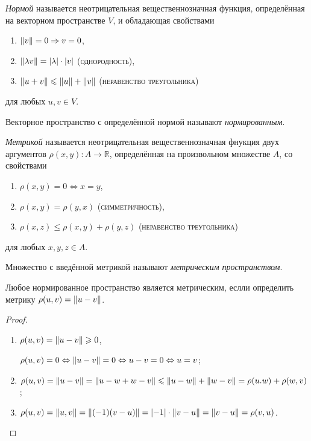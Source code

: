 
\begin{definition}
	\textit{Нормой} называется неотрицательная вещественнозначная функция, определённая на векторном пространстве $V$, и обладающая свойствами
	\begin{enumerate}
		\item $\norm{v} = 0 \Rightarrow v = 0$,
		
		\item $\norm{\lambda v} = \abs{\lambda} \cdot \abs{v}$ (\textsc{однородность}),
		
		\item $\norm{u + v} \leqslant \norm{u} + \norm{v}$ (\textsc{неравенство треугольника})
	\end{enumerate}
	для любых $u, v \in V$.
	
	Векторное пространство с определённой нормой называют \textit{нормированным}.
\end{definition}

\begin{definition}
	\textit{Метрикой} называется неотрицательная вещественнозначная фнукция двух аргументов $\rho(x, y): A \to \mathbb{R}$, определённая на произвольном множестве $A$, со свойствами 
	\begin{enumerate}
		\item $\rho(x, y) = 0 \Leftrightarrow x = y$,
		
		\item $\rho(x, y) = \rho(y, x)$ (\textsc{симметричность}),
		
		\item $\rho(x, z) \leqslant \rho(x, y) + \rho(y, z)$ (\textsc{неравенство треугольника})
	\end{enumerate}
	для любых $x, y, z \in A$.
	
	Множество с введённой метрикой называют \textit{метрическим пространством}.
\end{definition}

\begin{utv}
	Любое нормированное пространство является метрическим, еслли определить метрику $\rho(u, v) = \norm{u - v}$.
\end{utv}
\begin{proof}
	\begin{enumerate}
		\item $\rho(u, v) = \norm{u - v} \geqslant 0$,
		
		$\rho(u, v) = 0 \Leftrightarrow \norm{u - v} = 0 \Leftrightarrow u - v = 0 \Leftrightarrow u = v$;
		
		\item $\rho(u, v) = \norm{u - v} = \norm{u - w + w - v} \leqslant \norm{u - w} + \norm{w - v} = \rho(u. w) + \rho(w, v)$;
		
		\item $\rho(u, v) = \norm{u, v} = \norm{(- 1) (v - u)} = \abs{- 1} \cdot \norm{v - u} = \norm{v - u} = \rho(v, u)$. 
	\end{enumerate}
\end{proof}

